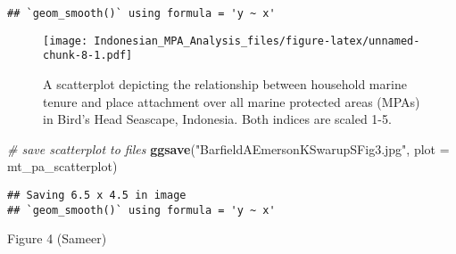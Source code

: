 \documentclass[
]{article}
\newenvironment{Shaded}{\begin{snugshade}}{\end{snugshade}}
\newcommand{\AttributeTok}[1]{\textcolor[rgb]{0.13,0.29,0.53}{#1}}
\newcommand{\CommentTok}[1]{\textcolor[rgb]{0.56,0.35,0.01}{\textit{#1}}}
\newcommand{\FunctionTok}[1]{\textcolor[rgb]{0.13,0.29,0.53}{\textbf{#1}}}
\newcommand{\NormalTok}[1]{#1}
\newcommand{\StringTok}[1]{\textcolor[rgb]{0.31,0.60,0.02}{#1}}
\begin{document}
\begin{verbatim}
## `geom_smooth()` using formula = 'y ~ x'
\end{verbatim}

\begin{figure}
\centering
\texttt{[image: Indonesian\_MPA\_Analysis\_files/figure-latex/unnamed-chunk-8-1.pdf]}
\caption{A scatterplot depicting the relationship between household
marine tenure and place attachment over all marine protected areas
(MPAs) in Bird's Head Seascape, Indonesia. Both indices are scaled 1-5.}
\end{figure}

\begin{Shaded}
\begin{Highlighting}[]
\CommentTok{\# save scatterplot to files }
\FunctionTok{ggsave}\NormalTok{(}\StringTok{"BarfieldAEmersonKSwarupSFig3.jpg"}\NormalTok{, }\AttributeTok{plot =}\NormalTok{ mt\_pa\_scatterplot)}
\end{Highlighting}
\end{Shaded}

\begin{verbatim}
## Saving 6.5 x 4.5 in image
## `geom_smooth()` using formula = 'y ~ x'
\end{verbatim}

Figure 4 (Sameer)
\end{document}
